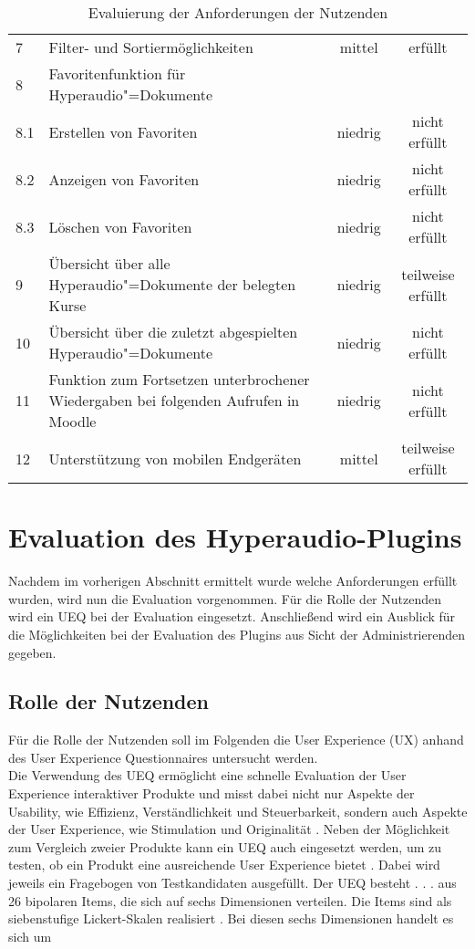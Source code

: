 \begin{table}[!ht]
\begin{tabularx}{\textwidth}{lXcc}
   	7 & Filter- und Sortiermöglichkeiten & mittel & erfüllt\\
    8 & Favoritenfunktion für Hyperaudio"=Dokumente & & \\
    8.1 & \hspace*{0.5cm} Erstellen von Favoriten & niedrig & nicht erfüllt\\
    8.2 & \hspace*{0.5cm} Anzeigen von Favoriten & niedrig & nicht erfüllt\\
    8.3 & \hspace*{0.5cm} Löschen von Favoriten & niedrig & nicht erfüllt\\    
    9 & Übersicht über alle Hyperaudio"=Dokumente der belegten Kurse & niedrig & teilweise erfüllt\\
    10 & Übersicht über die zuletzt abgespielten Hyperaudio"=Dokumente & niedrig & nicht erfüllt\\
    11 &  Funktion zum Fortsetzen unterbrochener Wiedergaben bei folgenden Aufrufen in Moodle & niedrig & nicht erfüllt\\
    12 & Unterstützung von mobilen Endgeräten & mittel & teilweise erfüllt\\
    \hline
\end{tabularx}
\caption{Evaluierung der Anforderungen der Nutzenden}
\label{tab:EvalAnforderungenNutzenden}
\end{table}
\FloatBarrier

\section{Evaluation des Hyperaudio-Plugins}
Nachdem im vorherigen Abschnitt ermittelt wurde welche Anforderungen erfüllt wurden, wird nun die Evaluation vorgenommen. Für die Rolle der Nutzenden wird ein UEQ bei der Evaluation eingesetzt. Anschließend wird ein Ausblick für die Möglichkeiten bei der Evaluation des Plugins aus Sicht der Administrierenden gegeben.

\subsection{Rolle der Nutzenden}
Für die Rolle der Nutzenden soll im Folgenden die User Experience (UX) anhand des User Experience Questionnaires untersucht werden.\\
Die Verwendung des UEQ ermöglicht eine schnelle Evaluation der User Experience interaktiver Produkte und misst dabei nicht nur Aspekte der Usability, wie Effizienz, Verständlichkeit und Steuerbarkeit, sondern auch Aspekte der User Experience, wie Stimulation und Originalität \citep{rauschenberger2013efficient}. Neben der Möglichkeit zum Vergleich zweier Produkte kann ein UEQ auch eingesetzt werden, um zu testen, ob ein Produkt eine ausreichende User Experience bietet \citep{schrepp2018user}. Dabei wird jeweils ein Fragebogen von Testkandidaten ausgefüllt. \glqq Der UEQ besteht . . . aus 26 bipolaren Items, die sich auf sechs Dimensionen verteilen. Die Items sind als siebenstufige Lickert-Skalen realisiert\grqq{} \citep{rauschenberger2013user}. Bei diesen sechs Dimensionen handelt es sich um

